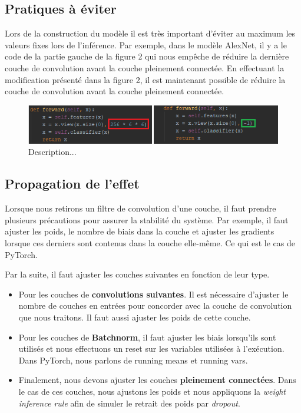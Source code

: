 \documentclass[12pt]{article}
\begin{document}
\subsection{Pratiques à éviter}
Lors de la construction du modèle il est très important d’éviter au maximum les valeurs fixes lors de l’inférence. Par exemple, dans le modèle AlexNet, il y a le code de la partie gauche de la figure 2 qui nous empêche de réduire la dernière couche de convolution avant la couche pleinement connectée. En effectuant la modification présenté dans la figure 2, il est maintenant possible de réduire la couche de convolution avant la couche pleinement connectée. 
\begin{figure}[H]
	\centering
	\includegraphics{mistake}
	\caption{Description...}
	\label{fig:mistake}
\end{figure}


\subsection{Propagation de l’effet}
Lorsque nous retirons un filtre de convolution d’une couche, il faut prendre plusieurs précautions pour assurer la stabilité du système. Par exemple, il faut ajuster les poids, le nombre de biais dans la couche et ajuster les gradients lorsque ces derniers sont contenus dans la couche elle-même. Ce qui est le cas de PyTorch.

Par la suite, il faut ajuster les couches suivantes en fonction de leur type.
\begin{itemize}[noitemsep, noitemsep, label={}]
	\item Pour les couches de \textbf{convolutions suivantes}. Il est nécessaire d’ajuster le nombre de couches en entrées pour concorder avec la couche de convolution que nous traitons. Il faut aussi ajuster les poids de cette couche. 
	\newpage
	\item Pour les couches de \textbf{Batchnorm}, il faut ajuster les biais lorsqu'ils sont utilisés et nous effectuons un reset sur les variables utilisées à l’exécution. Dans PyTorch, nous parlons de running means et running vars. 
	\item Finalement, nous devons ajuster les couches \textbf{pleinement connectées}. Dans le cas de ces couches, nous ajustons les poids et nous appliquons la \textit{weight inference rule}\cite{weightinference} afin de simuler le retrait des poids par \textit{dropout}. 
\end{itemize}
\end{document}
